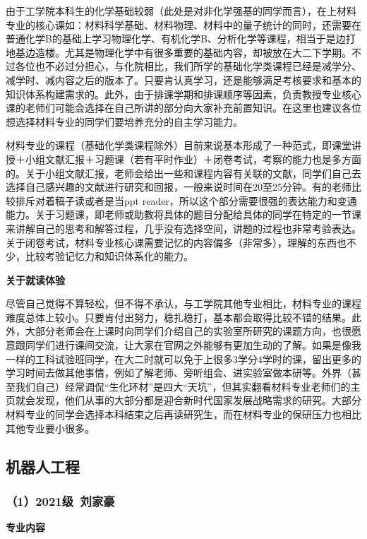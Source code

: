 \documentclass[11pt,oneside]{book}
\begin{document}
\vspace{10pt}

由于工学院本科生的化学基础较弱（此处是对非化学强基的同学而言），在上材料专业的核心课如：材料科学基础、材料物理、材料中的量子统计的同时，还需要在普通化学B的基础上学习物理化学、有机化学B、分析化学等课程，相当于是边打地基边造楼。尤其是物理化学中有很多重要的基础内容，却被放在大二下学期。不过各位也不必过分担心，与化院相比，我们所学的基础化学类课程已经是减学分、减学时、减内容之后的版本了。只要肯认真学习，还是能够满足考核要求和基本的知识体系构建需求的。此外，由于排课学期和排课顺序等因素，负责教授专业核心课的老师们可能会选择在自己所讲的部分向大家补充前置知识。在这里也建议各位想选择材料专业的同学们要培养充分的自主学习能力。

\vspace{10pt}

材料专业的课程（基础化学类课程除外）目前来说基本形成了一种范式，即课堂讲授＋小组文献汇报＋习题课（若有平时作业）＋闭卷考试，考察的能力也是多方面的。关于小组文献汇报，老师会给出一些和课程内容有关联的文献，同学们自己去选择自己感兴趣的文献进行研究和回报，一般来说时间在20至25分钟。有的老师比较排斥对着稿子读或者是当ppt reader，所以这个部分需要很强的表达能力和变通能力。关于习题课，即老师或助教将具体的题目分配给具体的同学在特定的一节课来讲解自己的思考和解答过程，几乎没有选择空间，讲题的过程也非常考验表达。关于闭卷考试，材料专业核心课需要记忆的内容偏多（非常多），理解的东西也不少，比较考验记忆力和知识体系化的能力。

\vspace{10pt}

\textbf{关于就读体验}

尽管自己觉得不算轻松，但不得不承认，与工学院其他专业相比，材料专业的课程难度总体上较小。只要肯付出努力，稳扎稳打，基本都会取得比较不错的结果。此外，大部分老师会在上课时向同学们介绍自己的实验室所研究的课题方向，也很愿意跟同学们进行课间交流，让大家在官网之外能够有更加生动的了解。如果是像我一样的工科试验班同学，在大二时就可以免于上很多3学分4学时的课，留出更多的学习时间去做其他事情，例如了解老师、旁听组会、进实验室做本研等。外界（甚至我们自己）经常调侃“生化环材”是四大“天坑”，但其实翻看材料专业老师们的主页就会发现，他们从事的大部分都是迎合新时代国家发展战略需求的研究。大部分材料专业的同学会选择本科结束之后再读研究生，而在材料专业的保研压力也相比其他专业要小很多。

\subsection{机器人工程}
\subsubsection{（1）2021级\ 刘家豪}
\textbf{专业内容}
\end{document}
